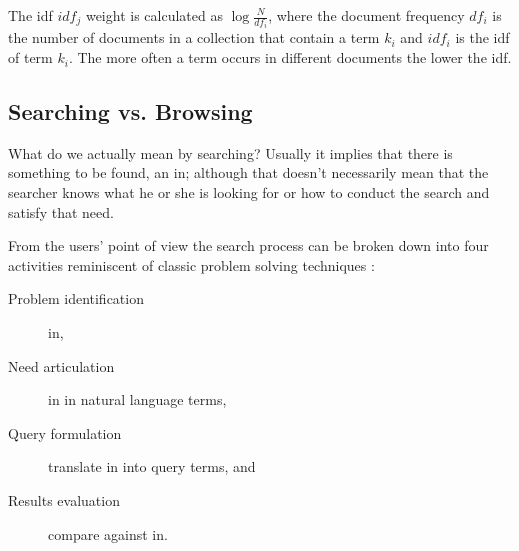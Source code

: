 The \gls{idf} $idf_j$ weight is calculated as $\log \frac{N}{df_i}$, where the document frequency $df_i$ is the number of documents in a collection that contain a term $k_i$ and $idf_i$ is the \gls{idf} of term $k_i$. The more often a term occurs in different documents the lower the \gls{idf}.





\subsection{Searching vs. Browsing}


What do we actually mean by searching? Usually it implies that there is something to be found, an \gls{in}; although that doesn’t necessarily mean that the searcher knows what he or she is looking for or how to conduct the search and satisfy that need.

From the users' point of view the search process can be broken down into four activities \autocite{Sutcliffe1998} reminiscent of classic problem solving techniques \autocite{Polya1957}:

\begin{description}
  \item [Problem identification] \gls{in},
  \item [Need articulation] \gls{in} in natural language terms,
  \item [Query formulation] translate \gls{in} into query terms, and
  \item [Results evaluation] compare against \gls{in}.
\end{description}

